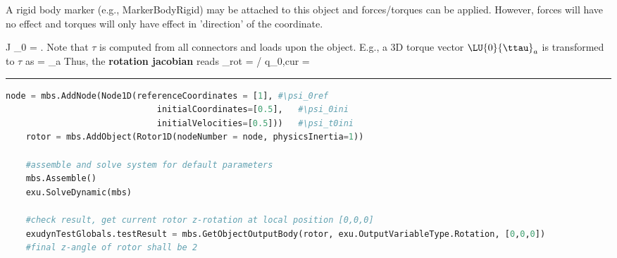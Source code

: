     \finishTable
    A rigid body marker (e.g., MarkerBodyRigid) may be attached to this object and forces/torques can be applied. 
    However, forces will have no effect and torques will only have effect in 'direction' of the coordinate.

    \be 
      J \cdot \ddot \psi_0 = \tau.
    \ee
    Note that $\tau$ is computed from all connectors and loads upon the object. E.g., a 3D torque vector $\LU{0}{\ttau}_a$ is 
    transformed to $\tau$ as
    \be
      \tau =  _a
    \ee
    Thus, the {\bf rotation jacobian} reads 
    \be
      \Jm_{rot} = \partial \tomega\cCur / \partial \dot q_{0,cur} = 
        
    \ee
\vspace{6pt}\par\noindent\rule{\textwidth}{0.4pt}
\label{miniExample_ObjectRotationalMass1D}
\pythonstyle
\begin{lstlisting}[language=Python, firstnumber=1]
    node = mbs.AddNode(Node1D(referenceCoordinates = [1], #\psi_0ref
                              initialCoordinates=[0.5],   #\psi_0ini
                              initialVelocities=[0.5]))   #\psi_t0ini
    rotor = mbs.AddObject(Rotor1D(nodeNumber = node, physicsInertia=1))

    #assemble and solve system for default parameters
    mbs.Assemble()
    exu.SolveDynamic(mbs)

    #check result, get current rotor z-rotation at local position [0,0,0]
    exudynTestGlobals.testResult = mbs.GetObjectOutputBody(rotor, exu.OutputVariableType.Rotation, [0,0,0])
    #final z-angle of rotor shall be 2

\end{lstlisting}

